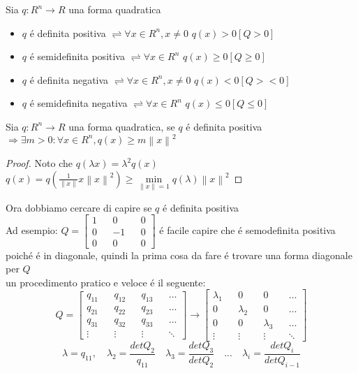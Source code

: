Sia $q:R^n\rightarrow R$ una forma quadratica\\
\begin{itemize}
	\item $q$ \'e definita positiva $\rightleftharpoons \forall x\in R^n, x\ne 0$ $q(x)>0 [Q>0]$
	\item $q$ \'e semidefinita positiva $\rightleftharpoons \forall x\in R^n$ $q(x)\ge0 [Q\ge0]$
	\item $q$ \'e definita negativa $\rightleftharpoons \forall x\in R^n, x\ne 0$ $q(x)<0 [Q><0]$
	\item $q$ \'e semidefinita negativa $\rightleftharpoons \forall x\in R^n$ $q(x)\le0 [Q\le0]$
\end{itemize}
\proposition
Sia $q:R^n\rightarrow R$ una forma quadratica, se $q$ \'e definita positiva $\Rightarrow \exists m>0: \forall x \in R^n, q(x)\ge m\left\|x\right\|^2$
\begin{proof}
	Noto che $q(\lambda x)=\lambda^2q(x)$\\
	$q(x)=q\left(\frac{1}{\left\|x\right\|}x\left\|x\right\|^2\right)\ge\min\limits_{\left\|x\right\|=1}q(\lambda)\left\|x\right\|^2$
\end{proof}
Ora dobbiamo cercare di capire se $q$ \'e definita positiva\\
Ad esempio: $Q=\begin{bmatrix}1&&0&&0\\0&&-1&&0\\0&&0&&0\end{bmatrix}$ \'e facile capire che \'e semodefinita positiva poich\'e \'e in diagonale, quindi la prima cosa da fare \'e trovare una forma diagonale per $Q$\\
un procedimento pratico e veloce \'e il seguente:\\
$$Q=\begin{bmatrix}q_{11}&&q_{12}&&q_{13}&&\ldots\\q_{21}&&q_{22}&&q_{23}&&\ldots\\q_{31}&&q_{32}&&q_{33}&&\ldots\\\vdots&&\vdots&&\vdots&&\ddots\end{bmatrix}\rightarrow\begin{bmatrix}\lambda_{1}&&0&&0&&\ldots\\0&&\lambda_{2}&&0&&\ldots\\0&&0&&\lambda_{3}&&\ldots\\\vdots&&\vdots&&\vdots&&\ddots\end{bmatrix}$$
$$\lambda=q_{11},\quad\lambda_{2}=\frac{detQ_2}{q_11}\quad\lambda_{3}=\frac{detQ_3}{detQ_2}\quad ...\quad \lambda_{i}=\frac{detQ_i}{detQ_{i-1}}$$
